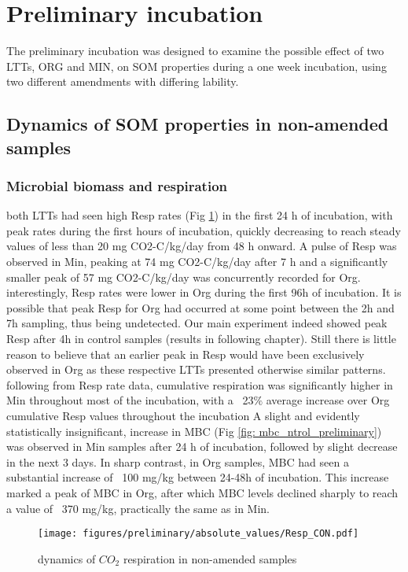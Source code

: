 \section{Preliminary incubation}
    The preliminary incubation was designed to examine the possible effect of two LTTs, ORG and MIN, on SOM properties during a one week incubation, using two different amendments with differing lability.
    
    \subsection{Dynamics of SOM properties in non-amended samples}
    
        \subsubsection{Microbial biomass and respiration}
            both LTTs had seen high Resp rates (Fig \ref{fig:resp_control_preliminary}) in the first 24 h of incubation, with peak rates during the first hours of incubation, quickly decreasing to reach steady values of less than 20 mg CO2-C/kg/day from 48 h onward. A pulse of Resp was observed in Min, peaking at 74  mg CO2-C/kg/day after 7 h and a significantly smaller peak of 57 mg CO2-C/kg/day was concurrently recorded for Org. interestingly, Resp rates were lower in Org during the first 96h of incubation. It is possible that peak Resp for Org had occurred at some point between the 2h and 7h  sampling, thus being undetected. Our main experiment indeed showed peak Resp after 4h in control samples (results in following chapter). Still there is little reason to believe that an earlier peak in Resp would have been exclusively observed in Org as these respective LTTs presented otherwise similar patterns.
            following from Resp rate data, cumulative respiration was significantly higher in Min throughout most of the incubation, with a ~23$\%$ average increase over Org cumulative Resp values throughout the incubation
            A slight and evidently statistically insignificant, increase in MBC (Fig \ref{fig: mbc_ntrol_preliminary}) was observed in Min samples after 24 h of incubation, followed by slight decrease in the next 3 days.  In sharp contrast, in Org samples, MBC had seen a substantial increase of ~100 mg/kg between 24-48h of incubation. This increase marked a peak of MBC in Org, after which MBC levels declined sharply to reach a value of ~370 mg/kg, practically the same as in Min.
        \begin{figure}[H]
            \centering
            \texttt{[image: figures/preliminary/absolute\_values/Resp\_CON.pdf]}
            \caption{dynamics of $CO_2$ respiration in non-amended samples}
            \label{fig:resp_control_preliminary}
        \end{figure}
        
